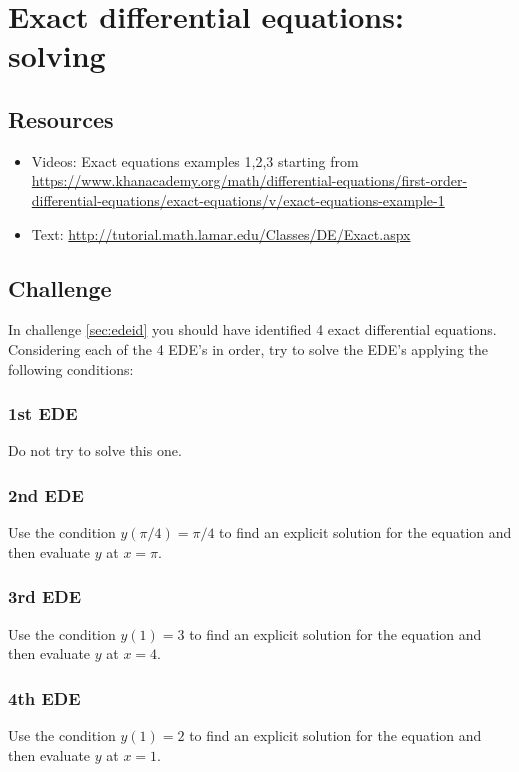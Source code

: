 
\timebox



\newpage
\section{Exact differential equations: solving}

\subsection*{Resources}
\begin{itemize}
    \item Videos: Exact equations examples 1,2,3 starting from \url{https://www.khanacademy.org/math/differential-equations/first-order-differential-equations/exact-equations/v/exact-equations-example-1}
    \item Text: \url{http://tutorial.math.lamar.edu/Classes/DE/Exact.aspx}
\end{itemize}

\subsection*{Challenge}
In challenge \ref{sec:edeid} you should have identified 4 exact differential equations. Considering each of the 4 EDE's in order, try to solve the EDE's applying the following conditions:

\subsubsection{1st EDE}
Do not try to solve this one.

\subsubsection{2nd EDE}
Use the condition $y(\pi/4)=\pi/4$ to find an explicit solution for the equation and then evaluate $y$ at $x=\pi$.

\subsubsection{3rd EDE}
Use the condition $y(1)=3$ to find an explicit solution for the equation and then evaluate $y$ at $x=4$.

\subsubsection{4th EDE}
Use the condition $y(1)=2$ to find an explicit solution for the equation and then evaluate $y$ at $x=1$.


